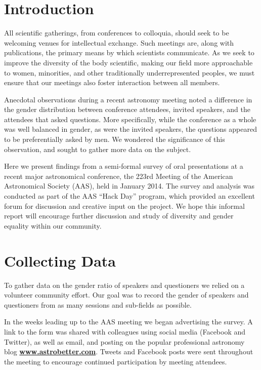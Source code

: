 \documentclass[iop]{emulateapj}
\begin{document}
\section{Introduction}
All scientific gatherings, from conferences to colloquia, should seek to be welcoming venues for intellectual exchange. Such meetings are, along with publications, the primary means by which scientists communicate. As we seek to improve the diversity of the body scientific, making our field more approachable to women, minorities, and other traditionally underrepresented peoples, we must ensure that our meetings also foster interaction between all members.

Anecdotal observations during a recent astronomy meeting noted a difference in the gender distribution  between conference attendees, invited speakers, and the attendees that asked questions. More specifically, while the conference as a whole was well balanced in gender, as were the invited speakers, the questions appeared to be preferentially asked by men. We wondered the significance of this observation, and sought to gather more data on the subject.

Here we present findings from a semi-formal survey of oral presentations at a recent major astronomical conference, the 223rd Meeting of the American Astronomical Society (AAS), held in January 2014. The survey and analysis was conducted as part of the AAS ``Hack Day'' program, which provided an excellent forum for discussion and creative input on the project. We hope this informal report will encourage further discussion and study of diversity and gender equality within our community.


\section{Collecting Data}
To gather data on the gender ratio of speakers and questioners we relied on a volunteer community effort. Our goal was to record the gender of speakers and questioners from as many sessions and sub-fields as possible. 

In the weeks leading up to the AAS meeting we began advertising the survey. A link to the form was shared with colleagues using social media (Facebook and Twitter), as well as email, and posting on the popular professional astronomy blog \href{http://www.astrobetter.com}{\bf{www.astrobetter.com}}. Tweets and Facebook posts were sent throughout the meeting to encourage continued participation by meeting attendees. 
\end{document}
